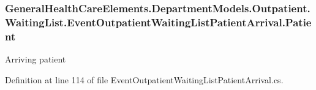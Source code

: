 \subsubsection[{\texorpdfstring{Patient}{Patient}}]{ General\+Health\+Care\+Elements.\+Department\+Models.\+Outpatient.\+Waiting\+List.\+Event\+Outpatient\+Waiting\+List\+Patient\+Arrival.\+Patient\hspace{0.3cm}{\ttfamily [get]}}\hypertarget{class_general_health_care_elements_1_1_department_models_1_1_outpatient_1_1_waiting_list_1_1_eveb69cba3dbb99690008a282b7e42002d2_a21e773359826e31f9650df566c174ae5}{}\label{class_general_health_care_elements_1_1_department_models_1_1_outpatient_1_1_waiting_list_1_1_eveb69cba3dbb99690008a282b7e42002d2_a21e773359826e31f9650df566c174ae5}


Arriving patient 



Definition at line 114 of file Event\+Outpatient\+Waiting\+List\+Patient\+Arrival.\+cs.

